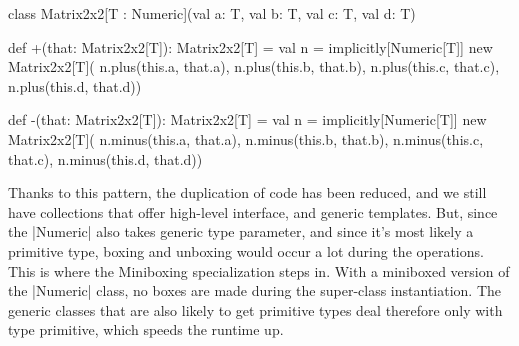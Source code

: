 \begin{lstlisting-nobreak}
 class Matrix2x2[T : Numeric](val a: T, val b: T, val c: T, val d: T) {
 
   def +(that: Matrix2x2[T]): Matrix2x2[T] = {
     val n = implicitly[Numeric[T]]
     new Matrix2x2[T](
       n.plus(this.a, that.a),
       n.plus(this.b, that.b),
       n.plus(this.c, that.c),
       n.plus(this.d, that.d))
   }
   
   def -(that: Matrix2x2[T]): Matrix2x2[T] = {
     val n = implicitly[Numeric[T]]
     new Matrix2x2[T](
       n.minus(this.a, that.a),
       n.minus(this.b, that.b),
       n.minus(this.c, that.c),
       n.minus(this.d, that.d))
   }
 }
\end{lstlisting-nobreak}
%      

Thanks to this pattern, the duplication of code has been reduced, and we still have collections that offer high-level interface, and generic templates. But, since the |Numeric| also takes generic type parameter, and since it's most likely a primitive type, boxing and unboxing would occur a lot during the operations. This is where the Miniboxing specialization steps in. With a miniboxed version of the |Numeric| class, no boxes are made during the super-class instantiation. The generic classes that are also likely to get primitive types deal therefore only with type primitive, which speeds the runtime up.